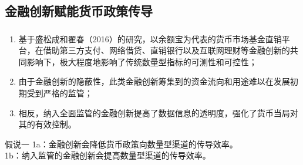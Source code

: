 \documentclass[12pt,aspectratio=169]{ctexbeamer}
\begin{document}
			\subsection{金融创新赋能货币政策传导}
			\begin{frame}
				\frametitle{}
				\begin{enumerate}
					\justifying
					\normalsize
					\item 基于盛松成和翟春（2016）的研究，以余额宝为代表的货币市场基金直销平台，在借助第三方支付、网络借贷、直销银行以及互联网理财等金融创新的共同影响下，极大程度地影响了传统数量型指标的可测性和可控性；
					\item 由于金融创新的隐蔽性，此类金融创新筹集到的资金流向和用途难以在发展初期受到严格的监管；\\
					\item 相反，纳入全面监管的金融创新提高了数据信息的透明度，强化了货币当局对其的有效控制。
				\end{enumerate}
				\centering
				\begin{minipage}{0.8\textwidth}
					\begin{block}{假说一}
						\fangsong 
						\justifying
						\hspace{2em}
						1a：金融创新会降低货币政策向数量型渠道的传导效率。\\
						\hspace{2em}
						1b：纳入监管的金融创新会提高数量型渠道的传导效率。
					\end{block}
				\end{minipage}
			\end{frame}
\end{document}
